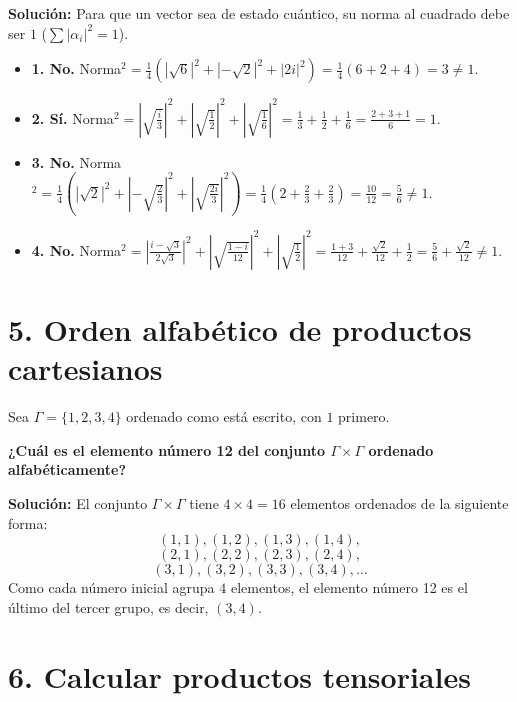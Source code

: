 \documentclass[11pt,a4paper]{article}
\begin{document}
\vspace{0.5em}
\textbf{Solución:}
Para que un vector sea de estado cuántico, su norma al cuadrado debe ser $1$ ($\sum |\alpha_i|^2 = 1$).
\begin{itemize}
    \item \textbf{1. No.} Norma$^2 = \frac{1}{4}\left(|\sqrt{6}|^2 + |-\sqrt{2}|^2 + |2i|^2\right) = \frac{1}{4}(6 + 2 + 4) = 3 \neq 1$.
    \item \textbf{2. Sí.} Norma$^2 = \left|\sqrt{\frac{i}{3}}\right|^2 + \left|\sqrt{\frac{1}{2}}\right|^2 + \left|\sqrt{\frac{1}{6}}\right|^2 = \frac{1}{3} + \frac{1}{2} + \frac{1}{6} = \frac{2+3+1}{6} = 1$.
    \item \textbf{3. No.} Norma$^2 = \frac{1}{4}\left(|\sqrt{2}|^2 + \left|-\sqrt{\frac{2}{3}}\right|^2 + \left|\sqrt{\frac{2i}{3}}\right|^2\right) = \frac{1}{4}\left(2 + \frac{2}{3} + \frac{2}{3}\right) = \frac{10}{12} = \frac{5}{6} \neq 1$.
    \item \textbf{4. No.} Norma$^2 = \left|\frac{i-\sqrt{3}}{2\sqrt{3}}\right|^2 + \left|\sqrt{\frac{1-i}{12}}\right|^2 + \left|\sqrt{\frac{1}{2}}\right|^2 = \frac{1+3}{12} + \frac{\sqrt{2}}{12} + \frac{1}{2} = \frac{5}{6} + \frac{\sqrt{2}}{12} \neq 1$.
\end{itemize}

\section*{5. Orden alfabético de productos cartesianos}

Sea $\Gamma=\{1,2,3,4\}$ ordenado como está escrito, con $1$ primero.

\textbf{¿Cuál es el elemento número 12 del conjunto $\Gamma\times\Gamma$ ordenado alfabéticamente?}

\vspace{0.5em}
\textbf{Solución:}
El conjunto $\Gamma \times \Gamma$ tiene $4 \times 4 = 16$ elementos ordenados de la siguiente forma:
$$(1,1), (1,2), (1,3), (1,4),$$
$$(2,1), (2,2), (2,3), (2,4),$$
$$(3,1), (3,2), (3,3), (3,4), \dots$$
Como cada número inicial agrupa $4$ elementos, el elemento número 12 es el último del tercer grupo, es decir, \textbf{$(3,4)$}.

\section*{6. Calcular productos tensoriales}
\end{document}
